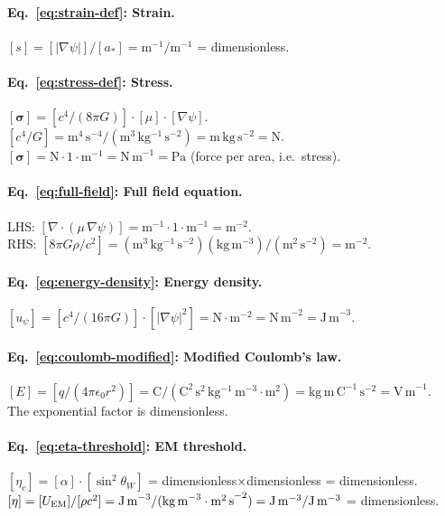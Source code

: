 \documentclass[11pt]{article}
\begin{document}
\paragraph{Eq.~\eqref{eq:strain-def}: Strain.}
$[s] = [|\nabla\psi|]/[a_*] = \mathrm{m}^{-1}/\mathrm{m}^{-1}$
= dimensionless. \checkmark

\paragraph{Eq.~\eqref{eq:stress-def}: Stress.}
$[\bm{\sigma}] = [c^4/(8\pi G)]\cdot[\mu]\cdot[\nabla\psi]$.\\
$[c^4/G] = \mathrm{m^4\,s^{-4}} / (\mathrm{m^3\,kg^{-1}\,s^{-2}})
= \mathrm{m\,kg\,s^{-2}} = \mathrm{N}$.\\
$[\bm{\sigma}] = \mathrm{N}\cdot 1\cdot\mathrm{m}^{-1}
= \mathrm{N\,m}^{-1} = \mathrm{Pa}$ (force per area, i.e.\ stress). \checkmark

\paragraph{Eq.~\eqref{eq:full-field}: Full field equation.}
LHS: $[\nabla\cdot(\mu\,\nabla\psi)] = \mathrm{m}^{-1}\cdot 1\cdot\mathrm{m}^{-1}
= \mathrm{m}^{-2}$.\\
RHS: $[8\pi G\rho/c^2] = (\mathrm{m^3\,kg^{-1}\,s^{-2}})(\mathrm{kg\,m^{-3}})/(\mathrm{m^2\,s^{-2}})
= \mathrm{m}^{-2}$. \checkmark

\paragraph{Eq.~\eqref{eq:energy-density}: Energy density.}
$[u_\psi] = [c^4/(16\pi G)]\cdot[|\nabla\psi|^2]
= \mathrm{N}\cdot\mathrm{m}^{-2}
= \mathrm{N\,m}^{-2} = \mathrm{J\,m}^{-3}$. \checkmark

\paragraph{Eq.~\eqref{eq:coulomb-modified}: Modified Coulomb's law.}
$[E] = [q/(4\pi\epsilon_0 r^2)] = \mathrm{C}/(\mathrm{C^2\,s^2\,kg^{-1}\,m^{-3}}\cdot\mathrm{m}^2)
= \mathrm{kg\,m\,C^{-1}\,s^{-2}} = \mathrm{V\,m}^{-1}$. \checkmark\\
The exponential factor is dimensionless. \checkmark

\paragraph{Eq.~\eqref{eq:eta-threshold}: EM threshold.}
$[\eta_c] = [\alpha]\cdot[\sin^2\theta_W]$ = dimensionless$\times$dimensionless
= dimensionless. \checkmark\\
$[\eta] = [U_{\rm EM}]/[\rho c^2] = \mathrm{J\,m}^{-3}/(\mathrm{kg\,m}^{-3}\cdot\mathrm{m^2\,s}^{-2})
= \mathrm{J\,m^{-3}}/\mathrm{J\,m^{-3}}$ = dimensionless. \checkmark
\end{document}
